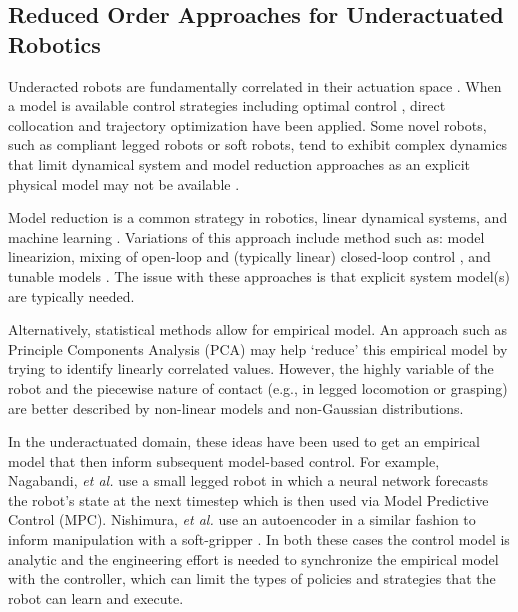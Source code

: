 \documentclass[letterpaper, 10 pt, conference]{ieeeconf}
\begin{document}
\subsection{Reduced Order Approaches for Underactuated Robotics}

Underacted robots are fundamentally correlated in their actuation space  \cite{tedrake2009underactuated}.
When a model is available control strategies including optimal control \cite{betts2010practical}, direct collocation \cite{von1993numerical} and trajectory optimization \cite{kalakrishnan2011stomp} have been applied.
Some novel robots, such as compliant legged robots or soft robots, tend to exhibit complex dynamics that limit dynamical system and model reduction approaches as an explicit physical model may not be available \cite{nakajima2015information}.

Model reduction is a common strategy in robotics, linear dynamical systems, and machine learning \cite{betts2010practical, sutton1998reinforcement}.   Variations of this approach include method such as: model linearizion, mixing of open-loop and (typically linear) closed-loop control \cite{kolter2010probabilistic}, and tunable models \cite{maeda2011tuned}.  The issue with these approaches is that explicit system model(s) are typically needed.  

Alternatively, statistical methods allow for empirical model.
An approach such as Principle Components Analysis (PCA) may help `reduce' this empirical model by trying to identify linearly correlated values.
However, the highly variable of the robot and the piecewise nature of contact (e.g., in legged locomotion or grasping) are better described by non-linear models and non-Gaussian distributions.  

In the underactuated domain, these ideas have been used to get an empirical model that then inform subsequent model-based control.  For example, Nagabandi, \emph{et al.} \cite{nagabandi2018learning} use a small legged robot in which a neural network forecasts the robot's state at the next timestep which is then used via Model Predictive Control (MPC).  Nishimura, \emph{et al.} use an autoencoder in a similar fashion to inform manipulation with a soft-gripper \cite{nishimura2017thin}.  In both these cases the control model is analytic and the engineering effort is needed to synchronize the empirical model with the controller, which can limit the types of policies and strategies that the robot can learn and execute.
\end{document}
